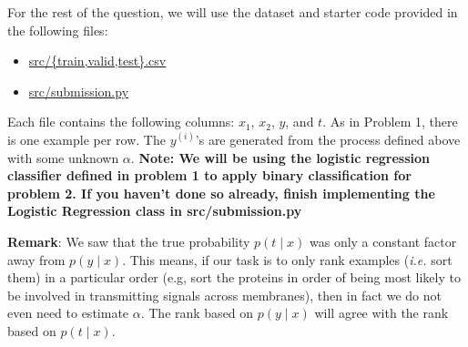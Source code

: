 For the rest of the question, we will use the dataset and starter code provided in
the following files:
%
\begin{center}
\begin{itemize}
\item	\url{src/{train,valid,test}.csv}
\item   \url{src/submission.py}
\end{itemize}
\end{center}
%
Each file contains the following columns: $x_1$, $x_2$, $y$, and $t$. As in
Problem 1, there is one example per row. The $y^{(i)}$'s are generated from the process defined above with some unknown $\alpha$.
\textbf{Note: We will be using the logistic regression classifier defined in problem 1 to apply binary classification for problem 2. If you haven't done so already, finish implementing the Logistic Regression class in src/submission.py}

\begin{enumerate}
    

    

    

    

    

    
\end{enumerate}

\textbf{Remark}: We saw that the true probability $p(t\mid x)$ was only a
constant factor away from $p(y\mid x)$. This means, if our task is to only rank
examples (\emph{i.e.} sort them) in a particular order (e.g, sort the proteins
in order of being most likely to be involved in transmitting signals across
membranes), then in fact we do not even need to estimate $\alpha$. The rank
based on $p(y\mid x)$ will agree with the rank based on $p(t\mid x)$.